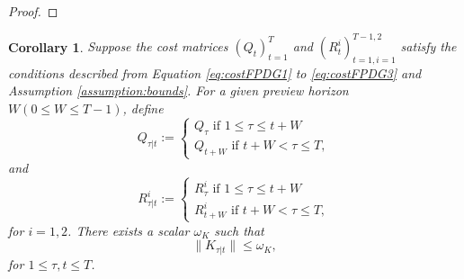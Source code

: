 \documentclass{article}
\newcommand{\transpose}{\mathsf{T}}
\newtheorem{corollary}{Corollary}
\begin{document}
\begin{proof}
    
\end{proof}

\begin{corollary}\label{corrolary:boundedK}
    Suppose the cost matrices $(Q_{t})_{t=1}^{T}$ and $(R_{t}^{i})_{t=1,i=1}^{T-1,2}$ satisfy the conditions described from Equation \eqref{eq:costFPDG1} to \eqref{eq:costFPDG3} and Assumption \ref{assumption:bounds}.
    For a given preview horizon $W(0\leq W \leq T-1)$, define
    \begin{equation}
        Q_{\tau|t}:= 
        \begin{cases}
            Q_{\tau} \text{ if $1\leq \tau \leq t+W$}\\
            Q_{t+W} \text{ if $t+W < \tau \leq T$},
        \end{cases}
    \end{equation}
    and
    \begin{equation}
        R_{\tau|t}^{i}:= 
        \begin{cases}
            R_{\tau}^{i} \text{ if $1\leq \tau \leq t+W$}\\
            R_{t+W}^{i} \text{ if $t+W < \tau \leq T$},
        \end{cases}
    \end{equation}
    for $i = {1,2}$.
    There exists a scalar $\omega_{K}$ such that
    \begin{equation*}
        \|K_{\tau|t}\| \leq \omega_{K},
    \end{equation*}
    for $1\leq \tau,t\leq T$.
\end{corollary}
\end{document}
